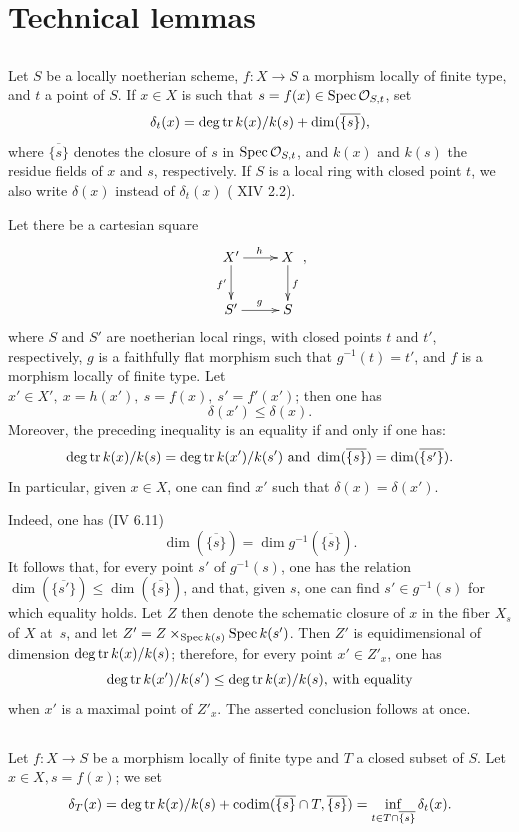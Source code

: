 \section{Technical lemmas} \label{XIV.2}

\subsection{\texorpdfstring{}{XIV.2.1}} \label{XIV.2.1}
Let $S$ be a locally noetherian scheme, $f:X\to S$ a morphism locally of finite type, and $t$ a point of $S$. If $x\in X$ is such that $s=f(x)\in\operatorname{Spec}\mathcal O_{S, t}$, set
$$
\delta_t(x)=\operatorname{deg\,tr} k(x)/k(s)+\dim(\overline{\{s\}}),
$$
where $\overline{\{s\}}$ denotes the closure of $s$ in $\operatorname{Spec}\mathcal O_{S, t}$, and $k(x)$ and $k(s)$ the residue fields of $x$ and $s$, respectively. If $S$ is a local ring with closed point $t$, we also write $\delta(x)$ instead of $\delta_t(x)$ (\cf {} XIV 2.2).
\begin{sublemme} \label{XIV.2.1.1} Let there be a cartesian square
$$
\xymatrix{X'\ar[r]^{h}\ar[d]_{f'}&X\ar[d]^f\\S'\ar[r]^g&S},
$$
where $S$ and $S'$ are noetherian local rings, with closed points $t$ and $t'$, respectively, $g$ is a faithfully flat morphism such that $g^{-1}(t)=t'$\pageoriginale, and $f$ is a morphism locally of finite type. Let $x'\in X',\ x=h(x'),\ s=f(x),\ s'=f'(x')$; then one has
$$
\delta(x')\leq\delta(x).
$$
Moreover, the preceding inequality is an equality if and only if one has:
$$
\operatorname{deg\,tr} k(x)/k(s)=\operatorname{deg\,tr} k(x')/k(s')\text{ and }\dim(\overline{\{s\}})=\dim(\overline{\{s'\}}).
$$
In particular, given $x\in X$, one can find $x'$ such that $\delta(x)=\delta(x')$.
\end{sublemme}

Indeed, one has (\EGA IV 6.11)
$$
\dim(\overline{\{s\}})=\dim g^{-1}(\overline{\{s\}}).
$$
It follows that, for every point $s'$ of $g^{-1}(s)$, one has the relation $\dim(\overline{\{s'\}})\leq \dim(\overline{\{s\}})$, and that, given $s$, one can find $s'\in g^{-1}(s)$ for which equality holds. Let $Z$ then denote the schematic closure of $x$ in the fiber $X_s$ of $X$ at~$s$, and let $Z'=Z\times_{\operatorname{Spec} k(s)}\operatorname{Spec} k(s')$. Then $Z'$ is equidimensional of dimension $\operatorname{deg\,tr} k(x)/k(s)$; therefore, for every point $x'\in Z'_{x}$, one has
$$
\operatorname{deg\,tr} k(x')/k(s')\leq\operatorname{deg\,tr} k(x)/k(s)\text{, with equality}$$
when $x'$ is a maximal point of $Z'_x$. The asserted conclusion follows at once.

\subsection{\texorpdfstring{}{XIV.2.2}} \label{XIV.2.2} Let $f:X\to S$ be a morphism locally of finite type and $T$ a closed subset of $S$. Let $x\in X, s=f(x)$; we set
$$
\delta_T(x)=\operatorname{deg\,tr} k(x)/k(s)+\operatorname{codim}(\overline{\{s\}}\cap T, \overline{\{s\}})=\inf_{t\in T\cap\overline{\{s\}}}\delta_t(x).
$$

